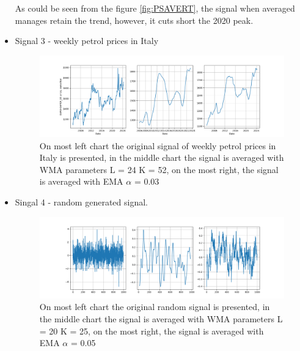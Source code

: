 \documentclass[a4paper,12pt,fleqn]{article}
\begin{document}
\begin{itemize}
                    As could be seen from the figure \ref{fig:PSAVERT}, the signal when averaged manages retain the
                    trend, however, it cuts short the 2020 peak.
                    \item Signal 3 - weekly petrol prices in Italy\cite{PETROL}
                    \begin{figure}[ht]
                        \centering
                        \includegraphics[width=1\textwidth]{images/FUEL_PRICE_ITALY.png} %
                        \caption{On most left chart the original signal of weekly petrol prices in Italy is presented, in 
                        the middle chart the signal is averaged with WMA parameters L = 24 K = 52, on the most right, the signal is averaged with EMA $\alpha$ = 0.03}
                        \label{fig:PETROL}
                    \end{figure}
                    \newpage
                    \item Singal 4 - random generated signal.                    
                    \begin{figure}[ht]
                        \centering
                        \includegraphics[width=1\textwidth]{images/random_signal.png} %
                        \caption{On most left chart the original random signal is presented, in 
                        the middle chart the signal is averaged with WMA parameters L = 20 K = 25, on the most right, the signal is averaged with EMA $\alpha$ = 0.05}
                        \label{fig:RANDOM}
                        
                    \end{figure}
                    
                \end{itemize}
\end{document}
